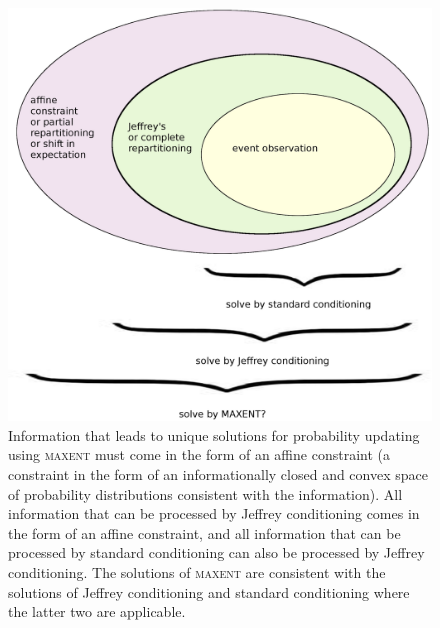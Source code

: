 \documentclass[12pt]{article}
\begin{document}
\begin{figure}[h!]
  \begin{flushright}
    \begin{minipage}[h]{.8\linewidth}
      \includegraphics[width=\textwidth]{affine1.eps}
      \caption{Information that leads to unique solutions for
        probability updating using \textsc{maxent} must come in the
        form of an affine constraint (a constraint in the form of an
        informationally closed and convex space of probability
        distributions consistent with the information). All
        information that can be processed by Jeffrey conditioning
        comes in the form of an affine constraint, and all information
        that can be processed by standard conditioning can also be
        processed by Jeffrey conditioning. The solutions of
        \textsc{maxent} are consistent with the solutions of Jeffrey
        conditioning and standard conditioning where the latter two
        are applicable.}
      \label{fig:aff}
    \end{minipage}
  \end{flushright}
\end{figure}
\end{document}
